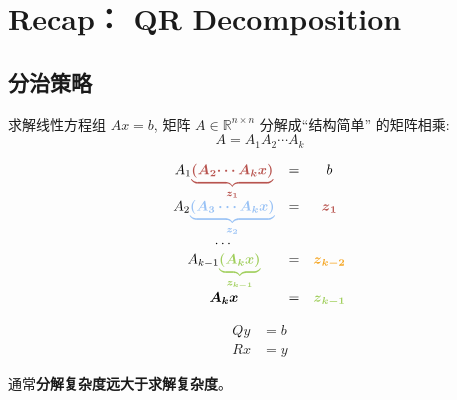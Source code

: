\section{Recap： QR Decomposition}

\subsection{分治策略}

求解线性方程组 $ A x=b $, 矩阵 $ A \in \mathbb{R}^{n \times n} $ 分解成“结构简单” 的矩阵相乘:
$$
A=A_{1} A_{2} \cdots A_{k}
$$

\begin{example}[求解k个线性方程组 $ A_{1} A_{2} \cdots A_{k} x=b $]
    $$\displaystyle \begin{matrix}
        A_{1}\textcolor[rgb]{0.72,0.33,0.31}{\boldsymbol{\underbrace{\boldsymbol{\textcolor[rgb]{0.72,0.33,0.31}{(}\textcolor[rgb]{0.72,0.33,0.31}{A}\textcolor[rgb]{0.72,0.33,0.31}{_{2}}\textcolor[rgb]{0.72,0.33,0.31}{\cdots A}\textcolor[rgb]{0.72,0.33,0.31}{_{k}}\textcolor[rgb]{0.72,0.33,0.31}{x}\textcolor[rgb]{0.72,0.33,0.31}{)}}}_{z_{1}}}} & = & b\\
        \textcolor[rgb]{0,0,0}{A}\textcolor[rgb]{0,0,0}{_{2}}\textcolor[rgb]{0.6,0.76,0.96}{\underbrace{\boldsymbol{( A_{3} \cdots A_{k} x)}}_{\boldsymbol{z_{2}}}} & = & \boldsymbol{\textcolor[rgb]{0.72,0.33,0.31}{z}\textcolor[rgb]{0.72,0.33,0.31}{_{1}}}\\
        \cdots  &  & \\
        A_{k-1}\textcolor[rgb]{0.63,0.81,0.37}{\boldsymbol{\underbrace{(\textcolor[rgb]{0.63,0.81,0.37}{A}\textcolor[rgb]{0.63,0.81,0.37}{_{k}}\textcolor[rgb]{0.63,0.81,0.37}{x}\textcolor[rgb]{0.63,0.81,0.37}{)}}_{z_{k-1}}}} & = & \boldsymbol{\textcolor[rgb]{0.96,0.65,0.14}{z}\textcolor[rgb]{0.96,0.65,0.14}{_{k-2}}}\\
        \boldsymbol{A_{k} x} & = & \boldsymbol{\textcolor[rgb]{0.63,0.81,0.37}{z}\textcolor[rgb]{0.63,0.81,0.37}{_{k-1}}}
        \end{matrix}$$
\end{example}

\begin{example}[QR分解$Ax = b$]
    $$
\begin{aligned}
    Q y&=b\\
    R x&=y
\end{aligned}
$$
\end{example}

通常\textbf{分解复杂度远大于求解复杂度}。


